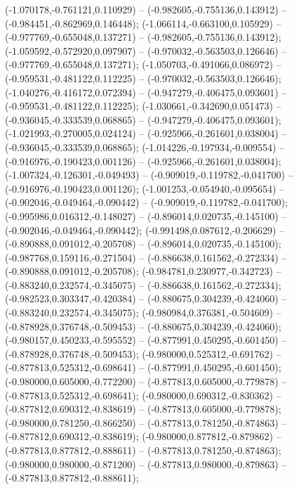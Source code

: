  (-1.070178,-0.761121,0.110929) -- (-0.982605,-0.755136,0.143912) -- (-0.984451,-0.862969,0.146448);
 (-1.066114,-0.663100,0.105929) -- (-0.977769,-0.655048,0.137271) -- (-0.982605,-0.755136,0.143912);
 (-1.059592,-0.572920,0.097907) -- (-0.970032,-0.563503,0.126646) -- (-0.977769,-0.655048,0.137271);
 (-1.050703,-0.491066,0.086972) -- (-0.959531,-0.481122,0.112225) -- (-0.970032,-0.563503,0.126646);
 (-1.040276,-0.416172,0.072394) -- (-0.947279,-0.406475,0.093601) -- (-0.959531,-0.481122,0.112225);
 (-1.030661,-0.342690,0.051473) -- (-0.936045,-0.333539,0.068865) -- (-0.947279,-0.406475,0.093601);
 (-1.021993,-0.270005,0.024124) -- (-0.925966,-0.261601,0.038004) -- (-0.936045,-0.333539,0.068865);
 (-1.014226,-0.197934,-0.009554) -- (-0.916976,-0.190423,0.001126) -- (-0.925966,-0.261601,0.038004);
 (-1.007324,-0.126301,-0.049493) -- (-0.909019,-0.119782,-0.041700) -- (-0.916976,-0.190423,0.001126);
 (-1.001253,-0.054940,-0.095654) -- (-0.902046,-0.049464,-0.090442) -- (-0.909019,-0.119782,-0.041700);
 (-0.995986,0.016312,-0.148027) -- (-0.896014,0.020735,-0.145100) -- (-0.902046,-0.049464,-0.090442);
 (-0.991498,0.087612,-0.206629) -- (-0.890888,0.091012,-0.205708) -- (-0.896014,0.020735,-0.145100);
 (-0.987768,0.159116,-0.271504) -- (-0.886638,0.161562,-0.272334) -- (-0.890888,0.091012,-0.205708);
 (-0.984781,0.230977,-0.342723) -- (-0.883240,0.232574,-0.345075) -- (-0.886638,0.161562,-0.272334);
 (-0.982523,0.303347,-0.420384) -- (-0.880675,0.304239,-0.424060) -- (-0.883240,0.232574,-0.345075);
 (-0.980984,0.376381,-0.504609) -- (-0.878928,0.376748,-0.509453) -- (-0.880675,0.304239,-0.424060);
 (-0.980157,0.450233,-0.595552) -- (-0.877991,0.450295,-0.601450) -- (-0.878928,0.376748,-0.509453);
 (-0.980000,0.525312,-0.691762) -- (-0.877813,0.525312,-0.698641) -- (-0.877991,0.450295,-0.601450);
 (-0.980000,0.605000,-0.772200) -- (-0.877813,0.605000,-0.779878) -- (-0.877813,0.525312,-0.698641);
 (-0.980000,0.690312,-0.830362) -- (-0.877812,0.690312,-0.838619) -- (-0.877813,0.605000,-0.779878);
 (-0.980000,0.781250,-0.866250) -- (-0.877813,0.781250,-0.874863) -- (-0.877812,0.690312,-0.838619);
 (-0.980000,0.877812,-0.879862) -- (-0.877813,0.877812,-0.888611) -- (-0.877813,0.781250,-0.874863);
 (-0.980000,0.980000,-0.871200) -- (-0.877813,0.980000,-0.879863) -- (-0.877813,0.877812,-0.888611);
